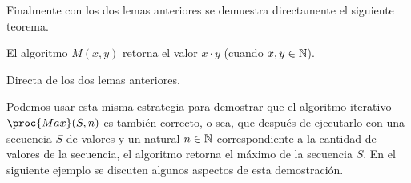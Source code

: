 Finalmente con los dos lemas anteriores se demuestra directamente el siguiente teorema.

\begin{teorema}
El algoritmo $M(x,y)$ retorna el valor $x\cdot y$ (cuando $x,y\in\mathbb{N}$).

\begin{demostracion}
Directa de los dos lemas anteriores.
\end{demostracion}
\end{teorema}

Podemos usar esta misma estrategia para demostrar que el algoritmo iterativo $\proc{Max}(S,n)$ es también correcto, o sea, que después de ejecutarlo con una secuencia $S$ de valores y un natural $n\in\mathbb{N}$ correspondiente a la cantidad de valores de la secuencia, el algoritmo retorna el máximo de la secuencia $S$.
En el siguiente ejemplo se discuten algunos aspectos de esta demostración.

